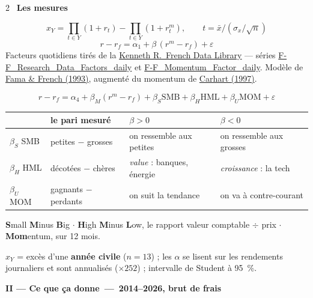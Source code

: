 \documentclass[9pt,a4paper]{extarticle}
\newcommand{\mouv}[2]{\vspace{1.7mm}{\color{bleu}\hrule height 1pt}\vspace{0.8mm}%
  {\color{bleu}\bfseries #1~---~#2}\par\vspace{0.5mm}{\color{bleu!35}\hrule height 0.5pt}\vspace{1.1mm}}
\newcommand{\etape}[2]{\vspace{0.9mm}{\color{rouge}\bfseries #1.}~{\bfseries #2}\par\vspace{0.15mm}}
\begin{document}
\begin{multicols}{2}
\etape{10}{Les mesures}
\[ x_Y = \textstyle\prod_{t\in Y}(1+r_t) - \prod_{t\in Y}(1+r^{m}_t),
   \qquad t = \bar x \big/ (\sigma_x/\sqrt n) \]
\[ r - r_f = \alpha_1 + \beta\,(r^{m} - r_f) + \varepsilon \]
{\footnotesize\color{grisf} Facteurs quotidiens tirés de la
\href{https://mba.tuck.dartmouth.edu/pages/faculty/ken.french/data_library.html}{\color{bleu}Kenneth
R.\ French Data Library} --- séries {\url{F-F_Research_Data_Factors_daily}} et
{\url{F-F_Momentum_Factor_daily}}. Modèle de
\href{https://doi.org/10.1016/0304-405X(93)90023-5}{\color{bleu}Fama \& French (1993)}, augmenté du
momentum de \href{https://doi.org/10.1111/j.1540-6261.1997.tb03808.x}{\color{bleu}Carhart (1997)}.}\par\vspace{0.5mm}
\[ r - r_f = \alpha_4 + \beta_M (r^{m}-r_f) + \beta_S \mathrm{SMB} + \beta_H \mathrm{HML} + \beta_U \mathrm{MOM} + \varepsilon \]
\vspace{-1.2mm}
{\scriptsize
\begin{tabular}{@{}l@{~~}>{\raggedright\arraybackslash}p{1.65cm}>{\raggedright\arraybackslash}p{2.2cm}>{\raggedright\arraybackslash}p{2.2cm}@{}}
\toprule
 & le pari mesuré & $\beta > 0$ & $\beta < 0$ \\
\midrule
$\beta_S$ SMB & petites $-$ grosses & on ressemble aux petites & on ressemble aux grosses \\
$\beta_H$ HML & décotées $-$ chères & \emph{value} : banques, énergie & \emph{croissance} : la tech \\
$\beta_U$ MOM & gagnants $-$ perdants & on suit la tendance & on va à contre-courant \\
\bottomrule
\end{tabular}}
\par\vspace{0.5mm}
{\scriptsize\color{grisf} \textbf{S}mall \textbf{M}inus \textbf{B}ig $\cdot$ \textbf{H}igh \textbf{M}inus
\textbf{L}ow, le rapport valeur comptable $\div$ prix $\cdot$ \textbf{Mom}entum, sur 12 mois.}
\par\vspace{0.9mm}
$x_Y$ = excès d'une \textbf{année civile} ($n = 13$) ; les $\alpha$ se lisent sur les rendements journaliers
et sont annualisés ($\times 252$) ; intervalle de Student à 95~\%.


\mouv{II --- Ce que ça donne}{2014--2026, brut de frais}


\end{multicols}
\end{document}
